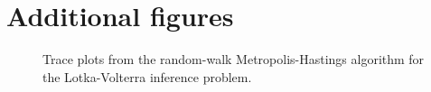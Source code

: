 \documentclass[11pt,a4paper]{report}
\begin{document}
\chapter{Additional figures}
\label{appendix:figures}

\begin{figure}[h]
\centering
{}
\caption{Trace plots from the random-walk Metropolis-Hastings algorithm for the Lotka-Volterra inference problem.
\label{fig:lotka-volterra:trace-plots}}
\end{figure}
\end{document}
